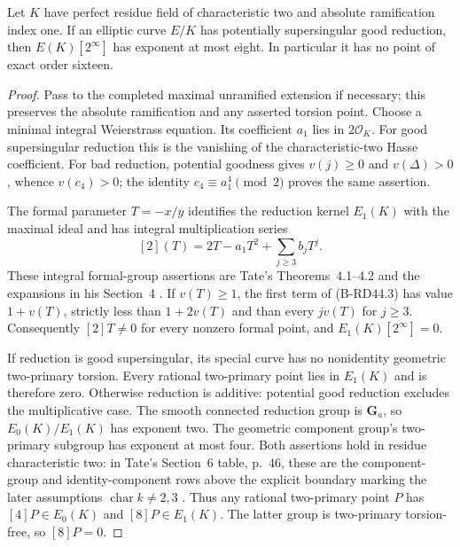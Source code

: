 \begin{lemma}
\label{lem:B-RD44-point}
Let $K$ have perfect residue field of characteristic two and
absolute ramification index one. If an elliptic curve $E/K$ has
potentially supersingular good reduction, then
$E(K)[2^\infty]$ has exponent at most eight.
In particular it has no point of exact order sixteen.
\end{lemma}
\begin{proof}
Pass to the completed maximal unramified extension if necessary;
this preserves the absolute ramification and any asserted torsion
point. Choose a minimal integral Weierstrass equation.
Its coefficient $a_1$ lies in $2\mathcal O_K$.
For good supersingular reduction this is the vanishing of the
characteristic-two Hasse coefficient. For bad reduction, potential
goodness gives $v(j)\ge0$ and $v(\Delta)>0$, whence $v(c_4)>0$;
the identity $c_4\equiv a_1^4\pmod2$ proves the same assertion.

The formal parameter $T=-x/y$ identifies the reduction kernel
$E_1(K)$ with the maximal ideal and has integral multiplication
series
\[
             [2](T)=2T-a_1T^2+\sum_{j\ge3}b_jT^j.
 \tag{B-RD44.3}
\]
These integral formal-group assertions are Tate's Theorems~4.1--4.2
and the expansions in his Section~4
\cite[pp.~41--44]{Tate1975Algorithm}.
If $v(T)\ge1$, the first term of (B-RD44.3) has value $1+v(T)$,
strictly less than $1+2v(T)$ and than every $jv(T)$ for $j\ge3$.
Consequently $[2]T\ne0$ for every nonzero formal point, and
$E_1(K)[2^\infty]=0$.

If reduction is good supersingular, its special curve has no
nonidentity geometric two-primary torsion. Every rational
two-primary point lies in $E_1(K)$ and is therefore zero.
Otherwise reduction is additive: potential good reduction excludes
the multiplicative case. The smooth connected reduction group is
$\mathbf G_a$, so $E_0(K)/E_1(K)$ has exponent two. The geometric
component group's two-primary subgroup has exponent at most four.
Both assertions hold in residue characteristic two: in Tate's
Section~6 table, p.~46, these are the component-group and
identity-component rows above the explicit boundary marking the
later assumptions $\operatorname{char}k\ne2,3$
\cite[Section~6, pp.~45--46]{Tate1975Algorithm}.
Thus any rational two-primary point $P$ has $[4]P\in E_0(K)$
and $[8]P\in E_1(K)$. The latter group is two-primary torsion-free,
so $[8]P=0$.
\end{proof}

